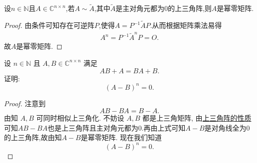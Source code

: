 \documentclass[../../main.tex]{subfiles}%
\begin{document}
\begin{proposition}\label{proposition:与主对角元都为0的上三角阵相似的矩阵一定是幂零阵}
设$n\in \mathbb{N}$且$A\in \mathbb{C}^{n\times n}$,若$A\sim \widetilde{A}$,其中$\widetilde{A}$是主对角元都为0的上三角阵,则$A$是幂零矩阵.
\end{proposition}
\begin{proof}
由条件可知存在可逆阵$P$,使得$A=P^{-1}\widetilde{A}P$.从而根据矩阵乘法易得
\begin{align*}
A^n=P^{-1}\widetilde{A}^nP=O.
\end{align*}
故$A$是幂零矩阵.
\end{proof}

\begin{example}
设 $n \in \mathbb{N}$ 且 $A, B \in \mathbb{C}^{n \times n}$ 满足
\[
AB + A = BA + B.
\]
证明:
\[
(A - B)^n = 0.
\]
\end{example}
\begin{proof}
注意到
\[
AB - BA = B - A.
\]
由知 $A, B$ 可同时相似上三角化. 不妨设 $A, B$ 都是上三角矩阵, 由\hyperref[proposition:上三角阵性质]{上三角阵的性质}可知$AB-BA$也是上三角阵且主对角元都为0.再由上式可知$A - B$是对角线全为0的上三角阵,故由知$A-B$是幂零矩阵. 现在我们知道
\[
(A - B)^n = 0.
\]
\end{proof}
\end{document}

